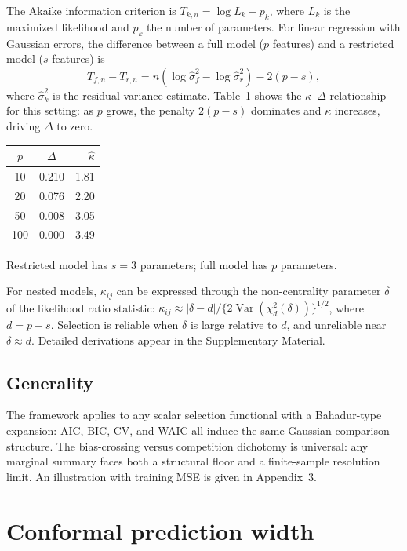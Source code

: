 \documentclass[lineno]{biometrika}
\DeclareMathOperator{\Var}{Var}
\begin{document}
The Akaike information criterion is $T_{k,n} = \log L_k - p_k$, where $L_k$ is the maximized likelihood and $p_k$ the number of parameters. For linear regression with Gaussian errors, the difference between a full model ($p$ features) and a restricted model ($s$ features) is
\[
T_{f,n} - T_{r,n} = n(\log\hat\sigma_f^2 - \log\hat\sigma_r^2) - 2(p-s),
\]
where $\hat\sigma_k^2$ is the residual variance estimate. Table~1 shows the $\kappa$--$\Delta$ relationship for this setting: as $p$ grows, the penalty $2(p-s)$ dominates and $\kappa$ increases, driving $\Delta$ to zero.

\begin{table}[ht]
{\begin{tabular}{ccr}
$p$ & $\Delta$ & $\hat\kappa$ \\ \hline
10 & 0.210 & 1.81 \\
20 & 0.076 & 2.20 \\
50 & 0.008 & 3.05 \\
100 & 0.000 & 3.49 \\
\end{tabular}}
\label{tab:aic}
\begin{tabnote}
Restricted model has $s=3$ parameters; full model has $p$ parameters.
\end{tabnote}
\end{table}

For nested models, $\kappa_{ij}$ can be expressed through the non-centrality parameter $\delta$ of the likelihood ratio statistic: $\kappa_{ij} \approx |\delta - d|/\{2\Var(\chi^2_d(\delta))\}^{1/2}$, where $d=p-s$. Selection is reliable when $\delta$ is large relative to $d$, and unreliable near $\delta \approx d$. Detailed derivations appear in the Supplementary Material.

\subsection{Generality}

The framework applies to any scalar selection functional with a Bahadur-type expansion: AIC, BIC, CV, and WAIC all induce the same Gaussian comparison structure. The bias-crossing versus competition dichotomy is universal: any marginal summary faces both a structural floor and a finite-sample resolution limit. An illustration with training MSE is given in Appendix~3.

\section{Conformal prediction width}
\end{document}
